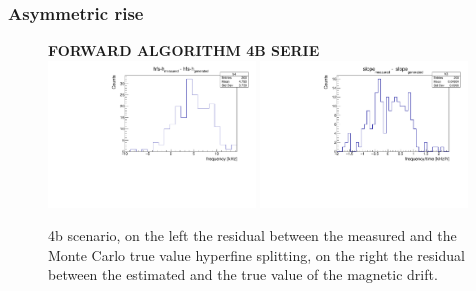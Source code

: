 \documentclass[11pt,a4paper,oneside]{article}
\begin{document}
\subsubsection{Asymmetric rise}

\begin{figure}[hbtp]
\centering
\textbf{FORWARD ALGORITHM 4B SERIE} \vspace{10pt}\\
\includegraphics[width = 0.49\textwidth]{forward/4bmuonONrise.pdf}
\includegraphics[width = 0.49\textwidth]{forward/4bmuonONrise_slope.pdf}
\caption{4b scenario, on the left the residual between the measured and the Monte Carlo true value hyperfine splitting, on the right the residual between the estimated and the true value of the magnetic drift.}
\end{figure}
\end{document}

